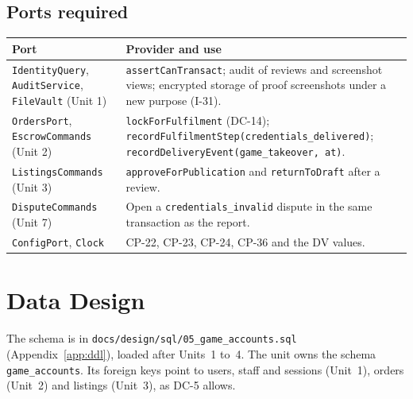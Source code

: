 \documentclass[11pt,a4paper]{article}
\newenvironment{dtable}[1]{\small\begin{longtable}{#1}}{\end{longtable}}
\begin{document}
\subsection{Ports required}
\begin{dtable}{@{}>{\raggedright\arraybackslash}p{4.6cm}>{\raggedright\arraybackslash}p{10.6cm}@{}}
\toprule
\textbf{Port} & \textbf{Provider and use} \\ \midrule \endhead
\texttt{IdentityQuery}, \texttt{AuditService}, \texttt{FileVault} (Unit 1) & \texttt{assertCanTransact}; audit of reviews and screenshot views; encrypted storage of proof screenshots under a new purpose (I-31). \\
\texttt{OrdersPort}, \texttt{EscrowCommands} (Unit 2) & \texttt{lockForFulfilment} (DC-14); \texttt{recordFulfilmentStep(credentials\_delivered)}; \texttt{recordDeliveryEvent(game\_takeover, at)}. \\
\texttt{ListingsCommands} (Unit 3) & \texttt{approveForPublication} and \texttt{returnToDraft} after a review. \\
\texttt{DisputeCommands} (Unit 7) & Open a \texttt{credentials\_invalid} dispute in the same transaction as the report. \\
\texttt{ConfigPort}, \texttt{Clock} & CP-22, CP-23, CP-24, CP-36 and the DV values. \\
\bottomrule
\end{dtable}
\section{Data Design}
\label{sec:data}
The schema is in \texttt{docs/design/sql/05\_game\_accounts.sql} (Appendix~\ref{app:ddl}), loaded after Units~1 to~4. The unit owns the schema \texttt{game\_accounts}. Its foreign keys point to users, staff and sessions (Unit~1), orders (Unit~2) and listings (Unit~3), as DC-5 allows.
\end{document}
